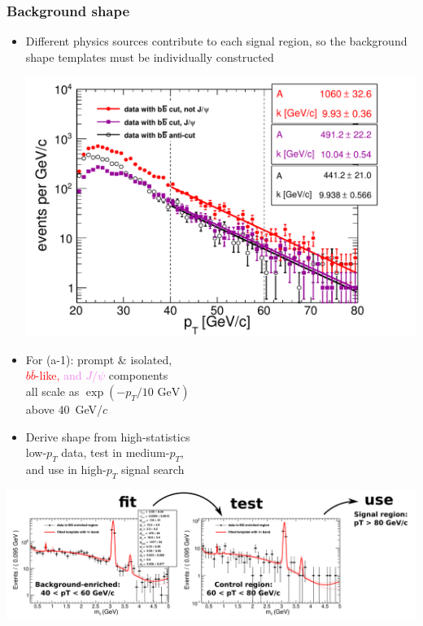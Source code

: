 \documentclass[compress]{beamer}
\begin{document}
\begin{frame}
\frametitle{Background shape}

\begin{itemize}
\item Different physics sources contribute to each signal region, so
  the background shape templates must be individually constructed

\hfill \includegraphics[width=0.50\linewidth]{support_bbbarcut_limits.pdf}

\vspace{-3.5 cm}
\item For (a-1): prompt \& isolated, \\ \textcolor{red}{$b\bar{b}$-like,} \textcolor{violet}{and $J/\psi$} components \\ all scale as {\scriptsize $\exp(-p_T/10\mbox{ GeV})$} \\ above 40~GeV/$c$

\item Derive shape from high-statistics \\ low-$p_T$ data, test in medium-$p_T$, \\ and use in high-$p_T$ signal search
\end{itemize}

\includegraphics[width=\linewidth]{background_shape_a1.png}
\end{frame}
\end{document}
